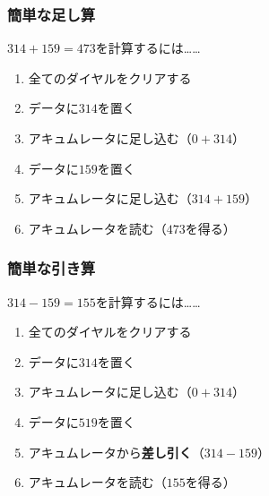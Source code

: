 \documentclass[
  lualatex,
  aspectratio=169,
  fleqn,
  14pt
]{beamer}
\begin{document}
\begin{frame}
  \frametitle{簡単な足し算}

  $314+159=473$を計算するには……

  \begin{enumerate}
    \item
      全てのダイヤルをクリアする
    \item
      データに$314$を置く
    \item
      アキュムレータに足し込む（$0+314$）
    \item
      データに$159$を置く
    \item
      アキュムレータに足し込む（$314+159$）
    \item
      アキュムレータを読む（$473$を得る）
  \end{enumerate}

\end{frame}

\begin{frame}
  \frametitle{簡単な引き算}

  $314-159=155$を計算するには……

  \begin{enumerate}
    \item
      全てのダイヤルをクリアする
    \item
      データに$314$を置く
    \item
      アキュムレータに足し込む（$0+314$）
    \item
      データに$519$を置く
    \item
      アキュムレータから\textbf{差し引く}（$314-159$）
    \item
      アキュムレータを読む（$155$を得る）
  \end{enumerate}

\end{frame}
\end{document}

